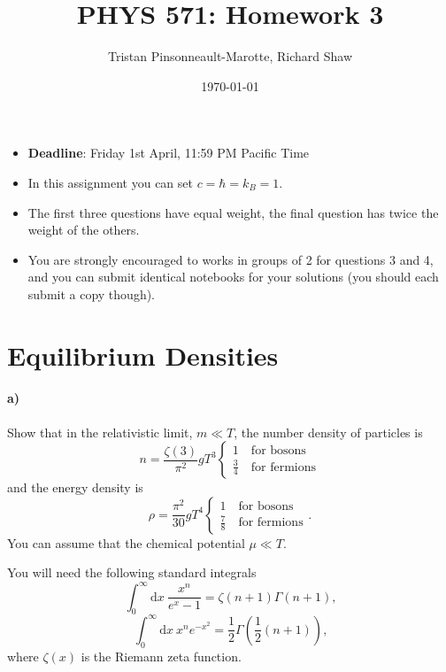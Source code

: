 \documentclass[12pt]{article}
\author{Tristan Pinsonneault-Marotte, Richard Shaw}
\title{PHYS 571: Homework 3}
\date{\today}
\newcommand\diff{\mathrm{d}}
\begin{document}
\maketitle

\begin{itemize}
    \item \textbf{Deadline}: Friday 1st April, 11:59 PM Pacific Time
    \item In this assignment you can set $c = \hbar = k_B = 1$.
    \item The first three questions have equal weight, the final question has twice the weight of the others.
    \item You are strongly encouraged to works in groups of 2 for questions 3 and 4, and you can submit identical notebooks for your solutions (you should each submit a copy though).
\end{itemize}



\section{Equilibrium Densities}

\paragraph{a)} Show that in the relativistic limit, $m \ll T$, the number
density of particles is
\begin{equation}
    n = \frac{\zeta(3)}{\pi^2} g T^3
    \begin{cases}
        1 \quad \text{for bosons} \\
        \frac{3}{4} \quad \text{for fermions}
    \end{cases}
\end{equation}
and the energy density is
\begin{equation}
    \rho = \frac{\pi^2}{30} g T^4
    \begin{cases}
        1 \quad \text{for bosons} \\
        \frac{7}{8} \quad \text{for fermions}
    \end{cases}
    \text{.}
\end{equation}
You can assume that the chemical potential $\mu \ll T$.

You will need the following standard integrals
\begin{equation}
    \int_0^{\infty} \diff x~\frac{x^n}{e^x - 1} = \zeta(n + 1) \Gamma(n + 1) \text{,}
\end{equation}
\begin{equation}
    \int_0^{\infty} \diff x~x^n e^{-x^2} =
    \frac{1}{2} \Gamma\left( \frac{1}{2} (n + 1) \right) \text{,}
\end{equation}
where $\zeta(x)$ is the Riemann zeta function.
\end{document}
